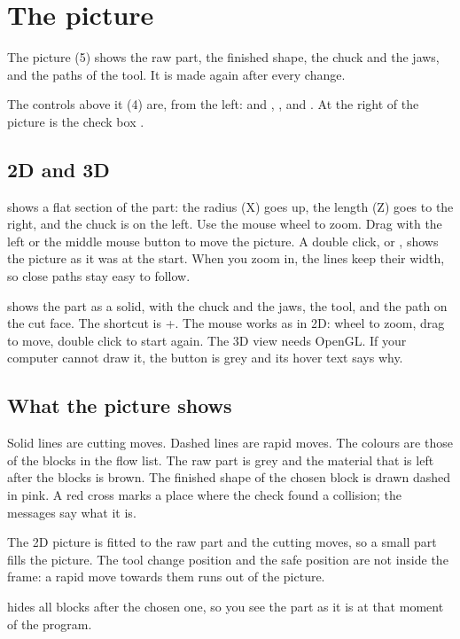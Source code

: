 \section{The picture}\label{sec:window:picture}

The picture (5) shows the raw part, the finished shape, the chuck and the jaws, and the paths of the tool. It is made again after every change.

The controls above it (4) are, from the left:  and , ,  and . At the right of the picture is the check box .

\subsection{2D and 3D}
 shows a flat section of the part: the radius (X) goes up, the length (Z) goes to the right, and the chuck is on the left. Use the mouse wheel to zoom. Drag with the left or the middle mouse button to move the picture. A double click, or , shows the picture as it was at the start. When you zoom in, the lines keep their width, so close paths stay easy to follow.

 shows the part as a solid, with the chuck and the jaws, the tool, and the path on the cut face. The shortcut is +. The mouse works as in 2D: wheel to zoom, drag to move, double click to start again. The 3D view needs OpenGL. If your computer cannot draw it, the  button is grey and its hover text says why.

\subsection{What the picture shows}
Solid lines are cutting moves. Dashed lines are rapid moves. The colours are those of the blocks in the flow list. The raw part is grey and the material that is left after the blocks is brown. The finished shape of the chosen block is drawn dashed in pink. A red cross marks a place where the check found a collision; the messages say what it is.

The 2D picture is fitted to the raw part and the cutting moves, so a small part fills the picture. The tool change position and the safe position are not inside the frame: a rapid move towards them runs out of the picture.

 hides all blocks after the chosen one, so you see the part as it is at that moment of the program.

